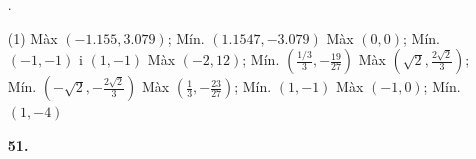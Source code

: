 \documentclass[a4paper, pdf, twoside]{book}
\begin{document}
\begin{enumerate}
\vspace{0.25cm}



 \item[\fontfamily{phv}\selectfont\color{blue}\textbf{}. ] 
 \begin{tasks}[column-sep=1em, item-indent=1.3333em](1)
	 \task* Màx $(-1.155,3.079)$; Mín. $(1.1547,-3.079)$
	 \task* Màx $(0,0)$; Mín. $(-1,-1)$ i $(1,-1)$
	 \task* Màx $(-2,12)$; Mín. $(\frac {1/3}{3},-\frac {19}{27})$
	 \task* Màx $(\sqrt {2},\frac {2\sqrt {2}}{3})$; Mín. $(-\sqrt {2},-\frac {2\sqrt {2}}{3})$
	 \task* Màx $(\frac {1}{3},-\frac {23}{27})$; Mín. $(1,-1)$
	 \task Màx $(-1,0)$; Mín. $(1,-4)$
\end{tasks}
\vspace{0.25cm}
\item[\fontfamily{phv}\selectfont\color{blue}\textbf{51. }] 

\end{enumerate}
\end{document}

